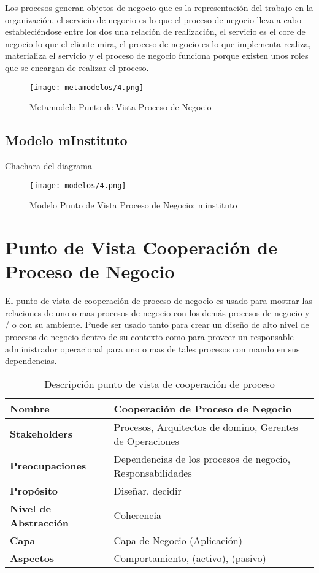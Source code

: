   Los procesos generan objetos de negocio que es la representación del trabajo en la organización,  el servicio de negocio es lo que el proceso de negocio lleva a cabo estableciéndose entre los dos una relación de realización, el servicio es el core de negocio lo que el cliente mira, el proceso de negocio es lo que implementa realiza, materializa el servicio y el proceso de negocio funciona porque existen unos roles que se encargan de realizar el proceso.
  
  \begin{figure}[!h]
  	\centering
  	\texttt{[image: metamodelos/4.png]}
  	\captionsetup{width=.95\textwidth}
  	\caption{Metamodelo Punto de Vista Proceso de Negocio}
  	\label{metamodelo4}
  \end{figure}
  
  \subsection{Modelo mInstituto}Chachara del diagrama
  \begin{figure}[!h]
  	\centering
  	\texttt{[image: modelos/4.png]}
  	\captionsetup{width=.95\textwidth}
  	\caption{Modelo Punto de Vista Proceso de Negocio: minstituto}
  	\label{modelo4}
  \end{figure}
  
  \section{Punto de Vista Cooperación de Proceso de Negocio}
  El punto de vista de cooperación de proceso de negocio es usado para mostrar las relaciones
  de uno o mas procesos de negocio con los demás procesos de negocio y / o con su ambiente. Puede ser usado tanto para crear un diseño de alto nivel de procesos de negocio dentro de su contexto como para proveer un responsable administrador operacional para uno o mas de tales procesos con mando en sus dependencias.
  
  \begin{table}[!h]
  	\centering
  	\begin{tabular}{lp{8cm}}
  		\toprule
  		\textbf{Nombre} & \textbf{Cooperación de Proceso de Negocio} \\
  		\midrule
  		\textbf{Stakeholders} & Procesos, Arquitectos de domino, Gerentes de Operaciones \\
  		\textbf{Preocupaciones} & Dependencias de los procesos de negocio, Responsabilidades \\
  		\textbf{Propósito} & Diseñar, decidir \\
  		\textbf{Nivel de Abstracción} & Coherencia \\
  		\textbf{Capa} & Capa de Negocio (Aplicación) \\
  		\textbf{Aspectos} & Comportamiento, (activo), (pasivo) \\
  		\bottomrule
  	\end{tabular}
  	\captionsetup{width=.95\textwidth}
  	\caption{Descripción punto de vista de cooperación de proceso}
  	\label{tabla8}
  \end{table}
  
